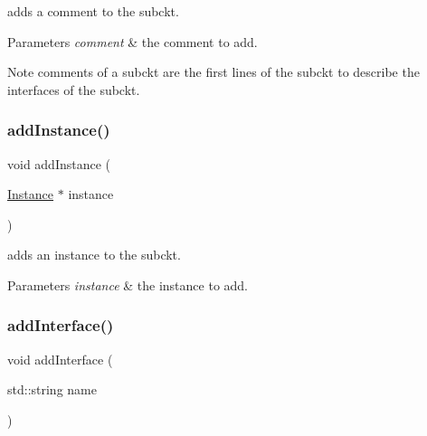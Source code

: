 adds a comment to the subckt. 


\begin{DoxyParams}{Parameters}
{\em comment} & the comment to add.\\
\hline
\end{DoxyParams}
\begin{DoxyNote}{Note}
comments of a subckt are the first lines of the subckt to describe the interfaces of the subckt. 
\end{DoxyNote}
\mbox{\label{class_s_p_i_c_e_1_1_subckt_a7bb4a4532643568ab1ac2c229185a88e}} 
\subsubsection{\texorpdfstring{add\+Instance()}{addInstance()}}
{\footnotesize\ttfamily void add\+Instance (\begin{DoxyParamCaption}\item[{\mbox{\hyperlink{class_s_p_i_c_e_1_1_instance}{Instance}} $\ast$}]{instance }\end{DoxyParamCaption})\hspace{0.3cm}{\ttfamily [inline]}}



adds an instance to the subckt. 


\begin{DoxyParams}{Parameters}
{\em instance} & the instance to add. \\
\hline
\end{DoxyParams}
\mbox{\label{class_s_p_i_c_e_1_1_subckt_ac162264683fa3d9b3384d3e8cc291fa2}} 
\subsubsection{\texorpdfstring{add\+Interface()}{addInterface()}}
{\footnotesize\ttfamily void add\+Interface (\begin{DoxyParamCaption}\item[{std\+::string}]{name }\end{DoxyParamCaption})\hspace{0.3cm}{\ttfamily [inline]}}



